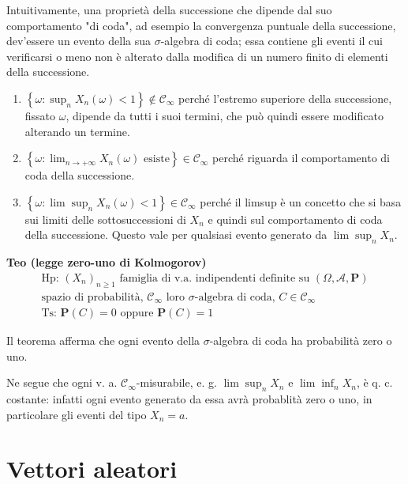 \documentclass{article}
\begin{document}
Intuitivamente, una propriet\`{a} della successione che dipende dal suo
comportamento "di coda", ad esempio la convergenza puntuale della
successione, dev'essere un evento della sua $\sigma $-algebra di coda; essa
contiene gli eventi il cui verificarsi o meno non \`{e} alterato dalla
modifica di un numero finito di elementi della successione.

\begin{enumerate}
\item $\left\{ \omega :\sup_{n}X_{n}\left( \omega \right) <1\right\} \not\in 
\mathcal{C}_{\infty }$ perch\'{e} l'estremo superiore della successione,
fissato $\omega $, dipende da tutti i suoi termini, che pu\`{o} quindi
essere modificato alterando un termine.

\item $\left\{ \omega :\lim_{n\rightarrow +\infty }X_{n}\left( \omega
\right) \text{ esiste}\right\} \in \mathcal{C}_{\infty }$ perch\'{e}
riguarda il comportamento di coda della successione.

\item $\left\{ \omega :\lim \sup_{n}X_{n}\left( \omega \right) <1\right\}
\in \mathcal{C}_{\infty }$ perch\'{e} il limsup \`{e} un concetto che si
basa sui limiti delle sottosuccessioni di $X_{n}$ e quindi sul comportamento
di coda della successione. Questo vale per qualsiasi evento generato da $%
\lim \sup_{n}X_{n}$.
\end{enumerate}

\textbf{Teo (legge zero-uno di Kolmogorov)}%
\begin{gather*}
\text{Hp: }\left( X_{n}\right) _{n\geq 1}\text{ famiglia di v.a.
indipendenti definite su }\left( \Omega ,\mathcal{A},\mathbf{P}\right) \text{
} \\
\text{spazio di probabilit\`{a}, }\mathcal{C}_{\infty }\text{ loro }\sigma 
\text{-algebra di coda, }C\in \mathcal{C}_{\infty } \\
\text{Ts: }\mathbf{P}\left( C\right) =0\text{ oppure }\mathbf{P}\left(
C\right) =1
\end{gather*}

Il teorema afferma che ogni evento della $\sigma $-algebra di coda ha
probabilit\`{a} zero o uno.

Ne segue che ogni v. a. $\mathcal{C}_{\infty }$-misurabile, e. g. $\lim
\sup_{n}X_{n}$ e $\lim \inf_{n}X_{n}$, \`{e} q. c. costante: infatti ogni
evento generato da essa avr\`{a} probablit\`{a} zero o uno, in particolare
gli eventi del tipo $X_{n}=a$.

\section{Vettori aleatori}
\end{document}

